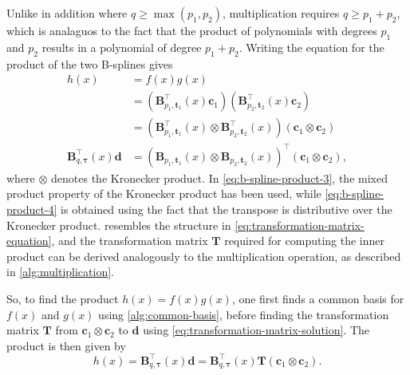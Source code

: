 Unlike in addition where $q \geq \max(p_1, p_2)$, multiplication requires $q \ge p_1 + p_2$, which is analaguos to the fact that the product of polynomials with degrees $p_1$ and $p_2$ results in a polynomial of degree $p_1 + p_2$.
Writing the equation for the product of the two B-splines gives
\begin{subequations}\label{eq:b-spline-product}
    \begin{align}
        h(x) &= f(x) g(x) \label{eq:b-spline-product-1} \\
        &= \left(\mathbf{B}_{p_1, \mathbf{t}_1}^{\top}(x) \mathbf{c}_1\right) 
        \left(\mathbf{B}_{p_2, \mathbf{t}_2}^{\top}(x) \mathbf{c}_2\right) \label{eq:b-spline-product-2} \\
        &= \left(\mathbf{B}_{p_1, \mathbf{t}_1}^{\top}(x) \otimes \mathbf{B}_{p_2, \mathbf{t}_2}^{\top}(x)\right) 
        \left(\mathbf{c}_1 \otimes \mathbf{c}_2\right) \label{eq:b-spline-product-3} \\
        \mathbf{B}_{q, \boldsymbol{\tau}}^{\top}(x) \mathbf{d} 
        &= \left(\mathbf{B}_{p_1, \mathbf{t}_1}(x) \otimes \mathbf{B}_{p_2, \mathbf{t}_2}(x)\right)^{\top} \left(\mathbf{c}_1 \otimes \mathbf{c}_2\right), \label{eq:b-spline-product-4}
    \end{align}
\end{subequations}
where $\otimes$ denotes the Kronecker product. In \cref{eq:b-spline-product-3}, the mixed product property of the Kronecker product has been used, while \cref{eq:b-spline-product-4} is obtained using the fact that the transpose is distributive over the Kronecker product.  resembles the structure in \cref{eq:transformation-matrix-equation}, and the transformation matrix $\mathbf T$ required for computing the inner product can be derived analogously to the multiplication operation, as described in \cref{alg:multiplication}.

So, to find the product $h(x) = f(x) g(x)$, one first finds a common basis for $f(x)$ and $g(x)$ using \cref{alg:common-basis}, before finding the transformation matrix $\mathbf T$ from $\mathbf c_1 \otimes \mathbf c_2$ to $\mathbf d$ using \cref{eq:transformation-matrix-solution}. The product is then given by
\begin{equation}
    h(x) = \mathbf B_{q, \boldsymbol{\tau}}^\top(x) \mathbf d = \mathbf B_{q, \boldsymbol{\tau}}^\top(x) \mathbf T (\mathbf c_1 \otimes \mathbf c_2).
\end{equation}

